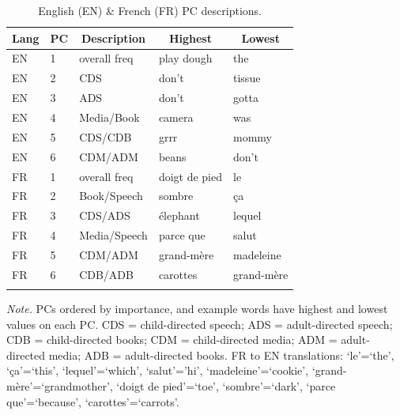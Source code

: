 \documentclass[10pt, letterpaper]{article}
\newenvironment{CodeChunk}{}{}
\begin{document}
\begin{CodeChunk}



\begin{table}[tbp]

\begin{center}
\begin{threeparttable}

\caption{\label{tab:table3}English (EN) \& French (FR) PC descriptions.}

\begin{tabular}{lllll}
\toprule
Lang & \multicolumn{1}{c}{PC} & \multicolumn{1}{c}{Description} & \multicolumn{1}{c}{Highest} & \multicolumn{1}{c}{Lowest}\\
\midrule
EN & 1 & overall freq & play dough & the\\
EN & 2 & CDS & don't & tissue\\
EN & 3 & ADS & don't & gotta\\
EN & 4 & Media/Book & camera & was\\
EN & 5 & CDS/CDB & grrr & mommy\\
EN & 6 & CDM/ADM & beans & don't\\
FR & 1 & overall freq & doigt de pied & le\\
FR & 2 & Book/Speech & sombre & ça\\
FR & 3 & CDS/ADS & élephant & lequel\\
FR & 4 & Media/Speech & parce que & salut\\
FR & 5 & CDM/ADM & grand-mère & madeleine\\
FR & 6 & CDB/ADB & carottes & grand-mère\\
\bottomrule
\addlinespace
\end{tabular}

\begin{tablenotes}[para]
\normalsize{\textit{Note.} PCs ordered by importance, and example words have highest and lowest values on each PC. CDS = child-directed speech; ADS = adult-directed speech; CDB = child-directed books; CDM = child-directed media; ADM = adult-directed media; ADB = adult-directed books. FR to EN translations: `le'=`the', `ça'=`this', `lequel'=`which', `salut'='hi', `madeleine'=`cookie', `grand-mère'=`grandmother', `doigt de pied'=`toe', `sombre'=`dark', `parce que'=`because', `carottes'=`carrots'.}
\end{tablenotes}

\end{threeparttable}
\end{center}

\end{table}


\end{CodeChunk}
\end{document}
